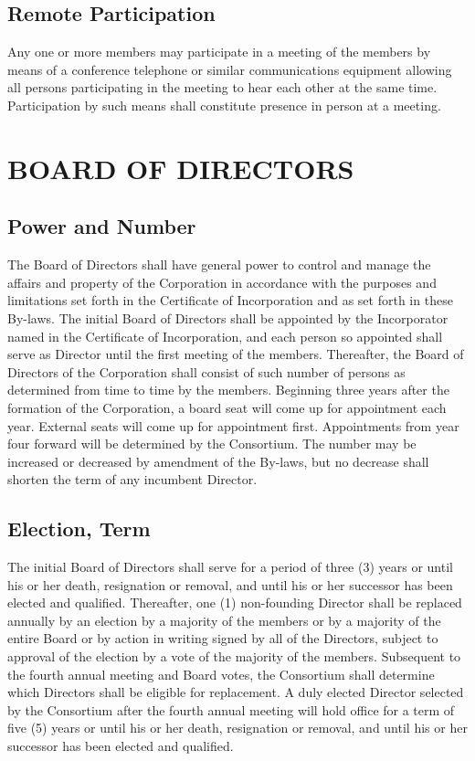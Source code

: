 \documentclass{article}
\begin{document}
\subsection{Remote Participation}
Any one or more members may participate in a meeting of the members by means of a conference telephone or similar communications equipment allowing all persons participating in the meeting to hear each other at the same time.  Participation by such means shall constitute presence in person at a meeting.
\section{BOARD OF DIRECTORS}
\subsection{Power and Number}
The Board of Directors shall have general power to control and manage the affairs and property of the Corporation in accordance with the purposes and limitations set forth in the Certificate of Incorporation and as set forth in these By-laws.  The initial Board of Directors shall be appointed by the Incorporator named in the Certificate of Incorporation, and each person so appointed shall serve as Director until the first meeting of the members.  Thereafter, the Board of Directors of the Corporation shall consist of such number of persons as determined from time to time by the members. Beginning three years after the formation of the Corporation, a board seat will come up for appointment each year. External seats will come up for appointment first. Appointments from year four forward will be determined by the Consortium. The number may be increased or decreased by amendment of the By-laws, but no decrease shall shorten the term of any incumbent Director.
\subsection{Election, Term}
The initial Board of Directors shall serve for a period of three (3) years or until his or her death, resignation or removal, and until his or her successor has been elected and qualified. Thereafter, one (1) non-founding Director shall be replaced annually by an election by a majority of the members or by a majority of the entire Board or by action in writing signed by all of the Directors, subject to approval of the election by a vote of the majority of the members. Subsequent to the fourth annual meeting and Board votes, the Consortium shall determine which Directors shall be eligible for replacement. A duly elected Director selected by the Consortium after the fourth annual meeting will hold office for a term of five (5) years or until his or her death, resignation or removal, and until his or her successor has been elected and qualified.
\end{document}
